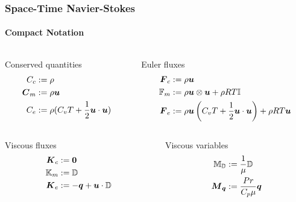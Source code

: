 \documentclass[18pt,xcolor=table]{beamer}
\begin{document}
\begin{frame}[t]
\frametitle{Space-Time Navier-Stokes}
\framesubtitle{Compact Notation}
\begin{columns}[t]
\begin{column}{0.5\textwidth}
Conserved quantities
\vspace{-2ex}
\begin{align*}
C_c&:=\rho\\
\boldsymbol C_m&:=\rho\boldsymbol u\\
C_e&:=\rho(C_v T+\frac{1}{2}\boldsymbol u\cdot\boldsymbol u)\\
\end{align*}
\end{column} 
\begin{column}{0.5\textwidth}
Euler fluxes 
\vspace{-2ex}
\begin{align*}
\boldsymbol F_c&:=\rho\boldsymbol u\\
\mathbb{F}_m&:=\rho\boldsymbol u\otimes\boldsymbol u+\rho RT\mathbb{I}\\
\boldsymbol F_e&:=\rho\boldsymbol u\left( C_v T+\frac{1}{2}\boldsymbol u\cdot\boldsymbol u \right)+\rho RT\boldsymbol u\\
\end{align*}
\end{column} 
\end{columns}
\begin{columns}[t]
\begin{column}{0.3\textwidth}
Viscous fluxes 
\vspace{-2ex}
\begin{align*}
\boldsymbol K_c&:=\boldsymbol 0\\
\mathbb{K}_m&:=\mathbb{D}\\
\boldsymbol K_e&:=-\boldsymbol q+\boldsymbol u\cdot\mathbb{D}\\
\end{align*}
\end{column} 
\begin{column}{0.3\textwidth}
Viscous variables
\vspace{-2ex}
\begin{align*}
\mathbb{M}_{\mathbb{D}}&:=\frac{1}{\mu}\mathbb{D}\\
\boldsymbol M_{\boldsymbol q}&:=\frac{Pr}{C_p\mu}\boldsymbol q\\
\end{align*}

\end{column}
\end{columns}
\end{frame}
\end{document}
